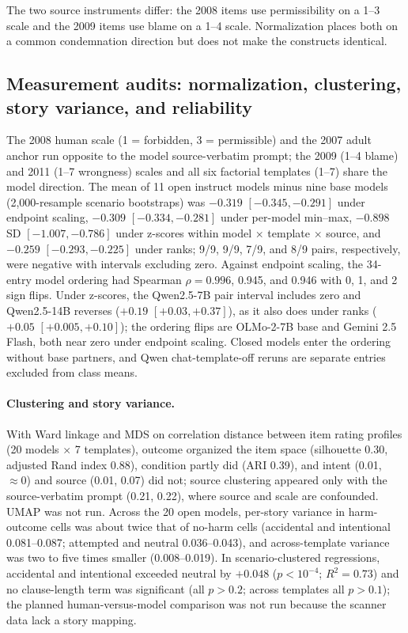 The two source instruments differ: the 2008 items use permissibility on a 1--3 scale and the 2009 items use blame on a 1--4 scale.
Normalization places both on a common condemnation direction but does not make the constructs identical.

\subsection{Measurement audits: normalization, clustering, story variance, and reliability}
\label{sec:supp-normalization}

The 2008 human scale (1 = forbidden, 3 = permissible) and the 2007 adult anchor run opposite to the model source-verbatim prompt; the 2009 (1--4 blame) and 2011 (1--7 wrongness) scales and all six factorial templates (1--7) share the model direction.
The mean of 11 open instruct models minus nine base models (2{,}000-resample scenario bootstraps) was $-0.319$ $[-0.345,-0.291]$ under endpoint scaling, $-0.309$ $[-0.334,-0.281]$ under per-model min--max, $-0.898$ SD $[-1.007,-0.786]$ under z-scores within model $\times$ template $\times$ source, and $-0.259$ $[-0.293,-0.225]$ under ranks; 9/9, 9/9, 7/9, and 8/9 pairs, respectively, were negative with intervals excluding zero.
Against endpoint scaling, the 34-entry model ordering had Spearman $\rho=0.996$, 0.945, and 0.946 with 0, 1, and 2 sign flips.
Under z-scores, the Qwen2.5-7B pair interval includes zero and Qwen2.5-14B reverses ($+0.19$ $[+0.03,+0.37]$), as it also does under ranks ($+0.05$ $[+0.005,+0.10]$); the ordering flips are OLMo-2-7B base and Gemini 2.5 Flash, both near zero under endpoint scaling.
Closed models enter the ordering without base partners, and Qwen chat-template-off reruns are separate entries excluded from class means.


\paragraph{Clustering and story variance.}
With Ward linkage and MDS on correlation distance between item rating profiles (20 models $\times$ 7 templates), outcome organized the item space (silhouette 0.30, adjusted Rand index 0.88), condition partly did (ARI 0.39), and intent (0.01, $\approx0$) and source (0.01, 0.07) did not; source clustering appeared only with the source-verbatim prompt (0.21, 0.22), where source and scale are confounded.
UMAP was not run.
Across the 20 open models, per-story variance in harm-outcome cells was about twice that of no-harm cells (accidental and intentional 0.081--0.087; attempted and neutral 0.036--0.043), and across-template variance was two to five times smaller (0.008--0.019).
In scenario-clustered regressions, accidental and intentional exceeded neutral by $+0.048$ ($p<10^{-4}$; $R^2=0.73$) and no clause-length term was significant (all $p>0.2$; across templates all $p>0.1$); the planned human-versus-model comparison was not run because the scanner data lack a story mapping.

